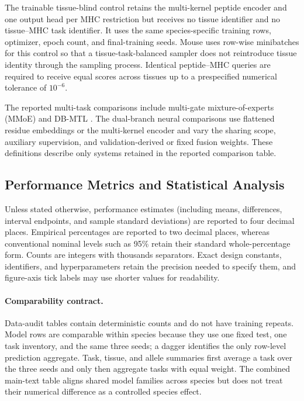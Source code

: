 The trainable tissue-blind control retains the multi-kernel peptide encoder and one output head per MHC restriction but receives no tissue identifier and no tissue--MHC task identifier. It uses the same species-specific training rows, optimizer, epoch count, and final-training seeds. Mouse uses row-wise minibatches for this control so that a tissue-task-balanced sampler does not reintroduce tissue identity through the sampling process. Identical peptide--MHC queries are required to receive equal scores across tissues up to a prespecified numerical tolerance of $10^{-6}$.

The reported multi-task comparisons include multi-gate mixture-of-experts (MMoE) \cite{ma2018mmoe} and DB-MTL \cite{lin2023dbmtl}. The dual-branch neural comparisons use flattened residue embeddings or the multi-kernel encoder and vary the sharing scope, auxiliary supervision, and validation-derived or fixed fusion weights. These definitions describe only systems retained in the reported comparison table.

\subsection{Performance Metrics and Statistical Analysis}

Unless stated otherwise, performance estimates (including means, differences, interval endpoints, and sample standard deviations) are reported to four decimal places. Empirical percentages are reported to two decimal places, whereas conventional nominal levels such as 95\% retain their standard whole-percentage form. Counts are integers with thousands separators. Exact design constants, identifiers, and hyperparameters retain the precision needed to specify them, and figure-axis tick labels may use shorter values for readability.

\paragraph{Comparability contract.}
Data-audit tables contain deterministic counts and do not have training repeats. Model rows are comparable within species because they use one fixed test, one task inventory, and the same three seeds; a dagger identifies the only row-level prediction aggregate. Task, tissue, and allele summaries first average a task over the three seeds and only then aggregate tasks with equal weight. The combined main-text table aligns shared model families across species but does not treat their numerical difference as a controlled species effect.

